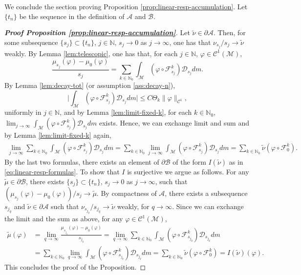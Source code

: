 \documentclass{amsart}
\numberwithin{equation}{section}
\newcommand\vf{\varphi}
\renewcommand{\le}{\leqslant}
\newcommand\cC{{\mathcal C}}
\newcommand\cF{{\mathcal F}}
\newcommand\cM{{\mathcal M}}
\newcommand\bN{{\mathbb N}}
\newcommand{\Deriv}{\mathcal D}
\begin{document}
We conclude the section proving Proposition \ref{prop:linear-resp-accumulation}. Let \(\{t_n\}\) be the sequence in the definition of \(\mathscr A\) and \(\mathscr B\).

\begin{proof}[\textbf{Proof Proposition \ref{prop:linear-resp-accumulation}}]
Let \(\widetilde \nu \in \partial \mathscr A\). Then, for some subsequence \(\{s_j\} \subset \{t_n\}\), \(j \in \bN\), \(s_j \to 0\) as \(j \to \infty\), one has that \(\nu_{s_j}/s_j \to \widetilde \nu\) weakly. By Lemma \ref{lem:telescopic}, one has that, for each \(j \in \bN\), \(\vf \in \cC^1(\cM)\),
\[
    \frac{\mu_{s_j}(\vf) - \mu_0(\vf) }{s_j} = \sum_{k \in \bN_0} \int_{\cM} ( \vf \circ \cF_{s_j}^k) \Deriv_{s_j} dm.
\]
By Lemma \ref{lem:decay-tot} (or assumption \ref{ass:decay-n}), 
\[
\biggl|\int_{\cM} ( \vf \circ \cF_{s_j}^k) \Deriv_{s_j} dm \biggr| \le C\Theta_k \|\vf\|_{\cC^1},
\]
uniformly in \(j \in \bN\), and by Lemma \ref{lem:limit-fixed-k}, for each \(k \in \bN_0\), \(\lim_{j \to \infty}\int_{\cM}( \vf \circ \cF_{s_j}^k ) \Deriv_{s_j} dm\) exists. Hence, we can exchange limit and sum and by Lemma \ref{lem:limit-fixed-k} again,
\[
\begin{split}
\lim_{j\to \infty}\sum_{k \in \bN_0} \int_{\cM}\!\!( \vf \circ \cF_{s_j}^k) \Deriv_{s_j} dm =\!\! \sum_{k \in \bN_0} \lim_{j\to \infty}\int_{\cM}\!\!( \vf \circ \cF_{s_j}^k) \Deriv_{s_j} dm = \!\!\sum_{k \in \bN_0} \widetilde \nu(\vf \circ \cF_0^k).
\end{split}
\]
By the last two formulas, there exists an element of \(\partial \mathscr B\) of the form \(I(\widetilde \nu)\) as in \eqref{eq:linear-resp-formulas}. To show that \(I\) is surjective we argue as follows. For any \(\widetilde \mu \in \partial \mathscr B\), there exists \(\{s_j\} \subset \{t_n\}\), \(s_j \to 0\) as \(j \to \infty\), such that \( (\mu_{s_j}(\vf) - \mu_0(\vf))/s_j \to \widetilde \mu\). By compactness of \(\mathscr A\), there exists a subsequence \(s_{j_q}\) and \(\widetilde \nu \in \partial \mathscr A\) such that \(\nu_{s_{j_q}}/s_{j_q} \to \widetilde \nu\) weakly, for \(q \to \infty\). Since we can exchange the limit and the sum as above, for any \(\vf \in \cC^1(\cM)\),
\[
\begin{split}
    \widetilde \mu(\vf) &=\lim_{q \to \infty} \frac{\mu_{s_{j_q}}(\vf) - \mu_0(\vf) }{s_{j_q}} = \lim_{q \to \infty}\sum_{k\in \bN_0} \int_{\cM} ( \vf \circ \cF_{s_{j_q}}^k) \Deriv_{s_{j_q}} dm\\
&=\sum_{k\in \bN_0}\lim_{q \to \infty} \int_{\cM} ( \vf \circ \cF_{s_{j_q}}^k ) \Deriv_{s_{j_q}} dm = \sum_{k \in \bN_0}\widetilde \nu \left( \vf \circ \cF_{0}^k\right) = I(\widetilde \nu)(\vf).
\end{split}
\] 
This concludes the proof of the Proposition.
\end{proof}
\end{document}
